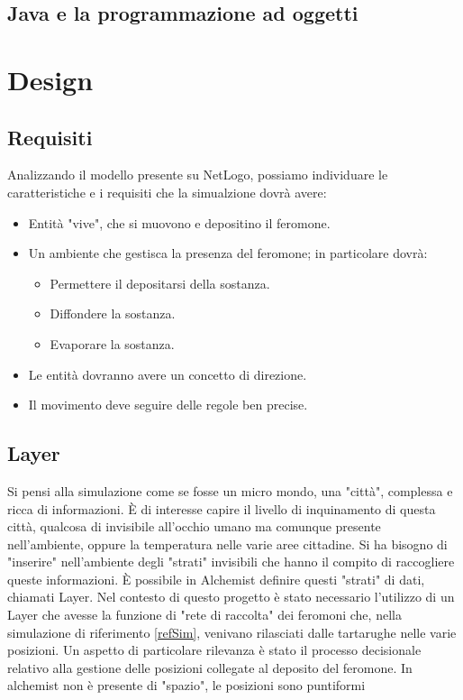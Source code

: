 \documentclass[12pt,a4paper,openright,twoside]{book}
\begin{document}
\section{Java e la programmazione ad oggetti}


\chapter{Design}
\section{Requisiti}
Analizzando il modello presente su NetLogo\cite{wilensky1997netlogo}, possiamo individuare 
le caratteristiche e i requisiti che la simualzione dovrà avere:
\begin{itemize}
    \item Entità "vive", che si muovono e depositino il feromone.
    \item Un ambiente che gestisca la presenza del feromone; in particolare dovrà:
    \begin{itemize}
        \item Permettere il depositarsi della sostanza.
        \item Diffondere la sostanza.
        \item Evaporare la sostanza.
    \end{itemize}
    \item Le entità dovranno avere un concetto di direzione.
    \item Il movimento deve seguire delle regole ben precise.
\end{itemize}
\section{Layer}
Si pensi alla simulazione come se fosse un micro mondo, una "città", complessa
e ricca di informazioni. È di interesse capire il livello di inquinamento di questa città, qualcosa di invisibile
all'occhio umano ma comunque presente nell'ambiente, oppure la temperatura nelle varie aree cittadine. Si ha bisogno
di "inserire" nell'ambiente degli "strati" invisibili che hanno il compito di raccogliere queste informazioni.
È possibile in Alchemist definire questi "strati" di dati, chiamati Layer.
\newline
Nel contesto di questo progetto è stato necessario l'utilizzo di un Layer che avesse la funzione di "rete di raccolta" 
dei feromoni che, nella simulazione di riferimento \ref{refSim}, venivano rilasciati dalle tartarughe nelle varie posizioni.
Un aspetto di particolare rilevanza è stato il processo decisionale relativo alla gestione delle posizioni collegate 
al deposito del feromone. In alchemist non è presente di "spazio", le posizioni sono puntiformi
\end{document}
